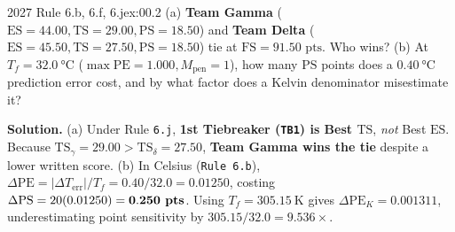\begin{workedexample}[Tiebreaker Resolution (\texttt{TB1 = Best TS}) \& The Celsius Denominator in $\mathrm{PE}$]{2027 Rule 6.b, 6.f, 6.j}{ex:00.2}
(a) \textbf{Team Gamma} ($\mathrm{ES}=44.00, \mathrm{TS}=29.00, \mathrm{PS}=18.50$) and \textbf{Team Delta} ($\mathrm{ES}=45.50, \mathrm{TS}=27.50, \mathrm{PS}=18.50$) tie at $\mathrm{FS} = 91.50\text{ pts}$. Who wins? (b) At $T_f = \SI{32.0}{\celsius}$ ($\max\mathrm{PE}=1.000, M_{\mathrm{pen}}=1$), how many $\mathrm{PS}$ points does a $\SI{0.40}{\celsius}$ prediction error cost, and by what factor does a Kelvin denominator misestimate it?
\par\smallskip\noindent
\textbf{Solution.} (a) Under Rule \texttt{6.j}, \textbf{1st Tiebreaker (\texttt{TB1}) is Best $\mathrm{TS}$}, \emph{not} Best $\mathrm{ES}$. Because $\mathrm{TS}_\gamma = 29.00 > \mathrm{TS}_\delta = 27.50$, \textbf{Team Gamma wins the tie} despite a lower written score.
(b) In Celsius (\texttt{Rule 6.b}), $\Delta\mathrm{PE} = |\Delta T_{\mathrm{err}}|/T_f = 0.40/32.0 = 0.01250$, costing $\Delta\mathrm{PS} = 20(0.01250) = \mathbf{0.250\text{\textbf{ pts}}}$. Using $T_f = \SI{305.15}{\kelvin}$ gives $\Delta\mathrm{PE}_K = 0.001311$, underestimating point sensitivity by $305.15/32.0 = \mathbf{9.536\times}$.
\end{workedexample}

